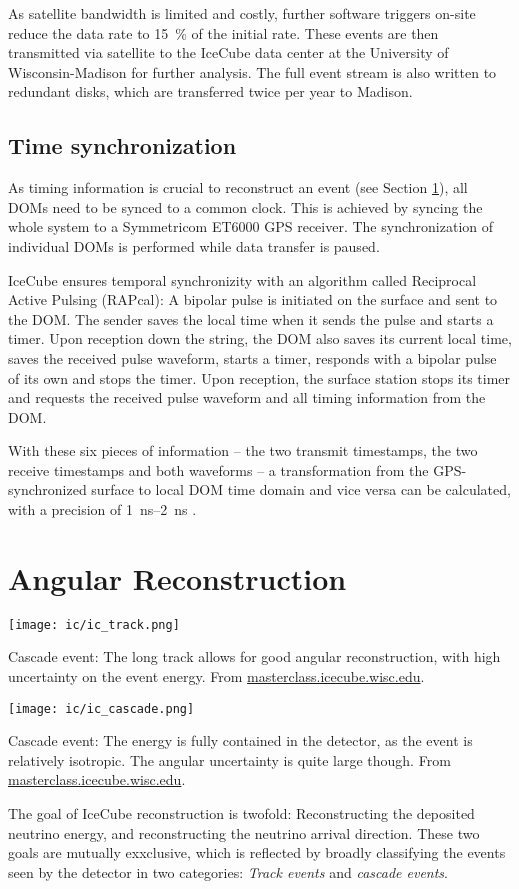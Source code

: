 As satellite bandwidth is limited and costly, further software triggers on-site reduce the data rate to \SI{15}{\percent} of the initial rate. These events are then transmitted via satellite to the IceCube data center at the University of Wisconsin-Madison for further analysis. The full event stream is also written to redundant disks, which are transferred twice per year to Madison.

\subsection{Time synchronization}
As timing information is crucial to reconstruct an event (see Section \ref{reconstruction}), all DOMs need to be synced to a common clock. This is achieved by syncing the whole system to a Symmetricom ET6000 GPS receiver. The synchronization of individual DOMs is performed while data transfer is paused.

IceCube ensures temporal synchronizity with an algorithm called Reciprocal Active Pulsing (RAPcal): A bipolar pulse is initiated on the surface and sent to the DOM. The sender saves the local time when it sends the pulse and starts a timer. Upon reception down the string, the DOM also saves its current local time, saves the received pulse waveform, starts a timer, responds with a bipolar pulse of its own and stops the timer. Upon reception, the surface station stops its timer and requests the received pulse waveform and all timing information from the DOM.

With these six pieces of information -- the two transmit timestamps, the two receive timestamps and both waveforms -- a transformation from the GPS-synchronized surface to local DOM time domain and vice versa can be calculated, with a precision of \SIrange{1}{2}{\ns} .

\section{Angular Reconstruction}\label{reconstruction}
\begin{marginfigure}
    \texttt{[image: ic/ic\_track.png]}
    \caption[Track event in IceCube]{Cascade event: The long track allows for good angular reconstruction, with high uncertainty on the event energy. From \url{masterclass.icecube.wisc.edu}.}
\end{marginfigure}
\begin{marginfigure}
    \texttt{[image: ic/ic\_cascade.png]}
    \caption[Cascade event in IceCube]{Cascade event: The energy is fully contained in the detector, as the event is relatively isotropic. The angular uncertainty is quite large though. From \url{masterclass.icecube.wisc.edu}.}
\end{marginfigure}
The goal of IceCube reconstruction is twofold: Reconstructing the deposited neutrino energy, and reconstructing the neutrino arrival direction. These two goals are mutually exxclusive, which is reflected by broadly classifying the events seen by the detector in two categories: \textit{Track events} and \textit{cascade events}.

